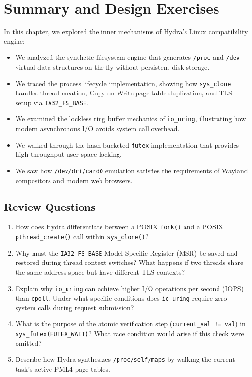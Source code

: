 \section{Summary and Design Exercises}
\label{sec:linux_engine_exercises}

In this chapter, we explored the inner mechanisms of Hydra's Linux compatibility engine:
\begin{itemize}
    \item We analyzed the synthetic filesystem engine that generates \texttt{/proc} and \texttt{/dev} virtual data structures on-the-fly without persistent disk storage.
    \item We traced the process lifecycle implementation, showing how \texttt{sys\_clone} handles thread creation, Copy-on-Write page table duplication, and TLS setup via \texttt{IA32\_FS\_BASE}.
    \item We examined the lockless ring buffer mechanics of \texttt{io\_uring}, illustrating how modern asynchronous I/O avoids system call overhead.
    \item We walked through the hash-bucketed \texttt{futex} implementation that provides high-throughput user-space locking.
    \item We saw how \texttt{/dev/dri/card0} emulation satisfies the requirements of Wayland compositors and modern web browsers.
\end{itemize}

\subsection*{Review Questions}
\begin{enumerate}
    \item How does Hydra differentiate between a POSIX \texttt{fork()} and a POSIX \texttt{pthread\_create()} call within \texttt{sys\_clone()}?
    \item Why must the \texttt{IA32\_FS\_BASE} Model-Specific Register (MSR) be saved and restored during thread context switches? What happens if two threads share the same address space but have different TLS contexts?
    \item Explain why \texttt{io\_uring} can achieve higher I/O operations per second (IOPS) than \texttt{epoll}. Under what specific conditions does \texttt{io\_uring} require zero system calls during request submission?
    \item What is the purpose of the atomic verification step (\texttt{current\_val != val}) in \texttt{sys\_futex(FUTEX\_WAIT)}? What race condition would arise if this check were omitted?
    \item Describe how Hydra synthesizes \texttt{/proc/self/maps} by walking the current task's active PML4 page tables.
\end{enumerate}
